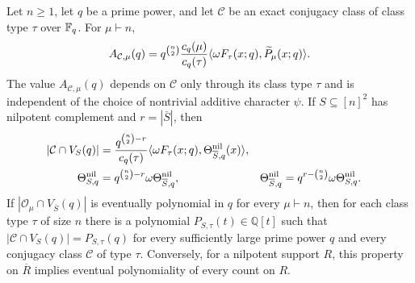 \begin{theorem}
\label{prop:nilpotent-fourier-kernel}\label{thm:exact-full-square}
\label{thm:fourier-complement}\label{cor:complement-equivalence}
Let $n\geq1$, let $q$ be a prime power, and let $\mathcal C$ be an
exact {conjugacy class} of class type $\tau$ over $\mathbb F_q$. For $\mu\vdash n$,
\begin{equation}
 A_{\mathcal C,\mu}(q)=q^{\binom n2}\frac{c_q(\mu)}{c_q(\tau)}
       \langle\omega F_\tau(x;q),\widetilde P_\mu(x;q)\rangle.
 \label{eq:orbital-fourier-scalar-product}
\end{equation}
{The value $A_{\mathcal C,\mu}(q)$ depends on
$\mathcal C$ only through its class type $\tau$ and is independent of
the choice of nontrivial additive character $\psi$.}
If $S\subseteq[n]^2$ has nilpotent complement and $r=|\overline S|$, then
\begin{align}
 |\mathcal C\cap V_S(q)|&=\frac{q^{\binom n2-r}}{c_q(\tau)}
    \langle\omega F_\tau(x;q),\Theta^{\mathrm{nil}}_{\overline S,q}(x)\rangle,
 \label{eq:fourier-complement-fieldwise}\\
 \Theta^{\mathrm{nil}}_{S,q}&=q^{\binom n2-r}\omega\Theta^{\mathrm{nil}}_{\overline S,q},&
 \Theta^{\mathrm{nil}}_{\overline S,q}&=q^{r-\binom n2}\omega\Theta^{\mathrm{nil}}_{S,q}.
 \label{eq:exact-full-square-theta}
\end{align}
{If $|\mathcal O_\mu\cap V_{\overline S}(q)|$ is
eventually polynomial in $q$ for every $\mu\vdash n$, then for each class
type $\tau$ of size $n$ there is a polynomial
$P_{S,\tau}(t)\in\mathbb Q[t]$ such that
$|\mathcal C\cap V_S(q)|=P_{S,\tau}(q)$ for every sufficiently large
prime power $q$ and every conjugacy class $\mathcal C$ of type $\tau$.}
Conversely, for a nilpotent support $R$, this property on
$\overline R$ implies eventual polynomiality of every count on $R$.
\end{theorem}

